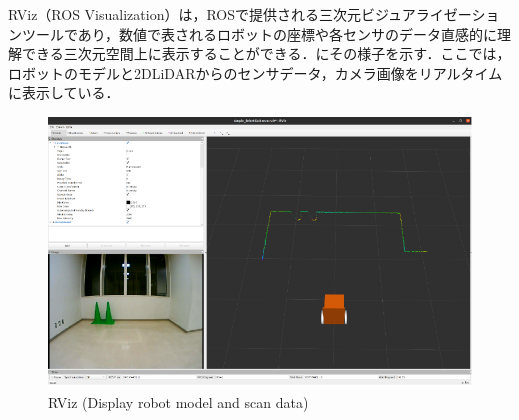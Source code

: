   RViz（ROS Visualization）\cite{rviz}は，ROSで提供される三次元ビジュアライゼーションツールであり，数値で表されるロボットの座標や各センサのデータ直感的に理解できる三次元空間上に表示することができる．にその様子を示す．ここでは，ロボットのモデルと2DLiDARからのセンサデータ，カメラ画像をリアルタイムに表示している．

  \begin{figure}[h]
    \centering
    \includegraphics[width=12cm] {images/pdf/RobotGuidance_rviz}
    \caption{RViz (Display robot model and scan data)}
    \label{Fig:RobotGuidance_rviz}
  \end{figure}

\newpage